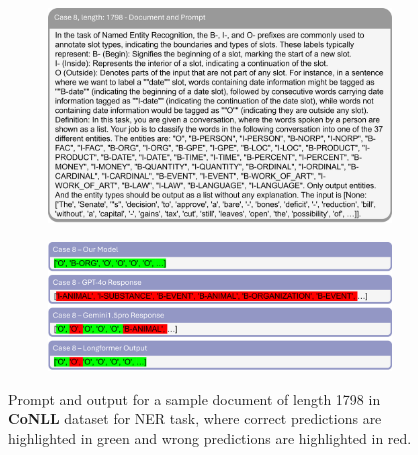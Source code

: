 \documentclass[11pt]{article}
\begin{document}
\begin{figure}[!h]
    \centering
    \begin{subfigure}[b]{1.0\linewidth}   
        \includegraphics[width=\textwidth]{images/case8_prompt.png} %
    \end{subfigure}
    \vspace{1pt}
    \begin{subfigure}[b]{1.0\linewidth}  
        \includegraphics[width=\textwidth]{images/case8_ans.png}
    \end{subfigure}
    \caption{Prompt and output for a sample document of length 1798 in \textbf{CoNLL} dataset for NER task, where correct predictions are highlighted in green and wrong predictions are highlighted in red.}
    \label{case8}
\end{figure}

\end{document}

